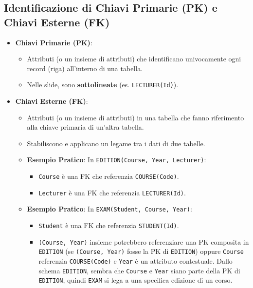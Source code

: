 \subsection{Identificazione di Chiavi Primarie (PK) e Chiavi Esterne (FK)}
\begin{itemize}
    \item \textbf{Chiavi Primarie (PK)}:
    \begin{itemize}
        \item Attributi (o un insieme di attributi) che identificano univocamente ogni record (riga) all'interno di una tabella.
        \item Nelle slide, sono \textbf{sottolineate} (es. \texttt{LECTURER(Id)}).
    \end{itemize}
    \item \textbf{Chiavi Esterne (FK)}:
    \begin{itemize}
        \item Attributi (o un insieme di attributi) in una tabella che fanno riferimento alla chiave primaria di un'altra tabella.
        \item Stabiliscono e applicano un legame tra i dati di due tabelle.
        \item \textbf{Esempio Pratico}: In \texttt{EDITION(Course, Year, Lecturer)}:
        \begin{itemize}
            \item \texttt{Course} è una FK che referenzia \texttt{COURSE(Code)}.
            \item \texttt{Lecturer} è una FK che referenzia \texttt{LECTURER(Id)}.
        \end{itemize}
        \item \textbf{Esempio Pratico}: In \texttt{EXAM(Student, Course, Year)}:
        \begin{itemize}
            \item \texttt{Student} è una FK che referenzia \texttt{STUDENT(Id)}.
            \item \texttt{(Course, Year)} insieme potrebbero referenziare una PK composita in \texttt{EDITION} (se \texttt{(Course, Year)} fosse la PK di \texttt{EDITION}) oppure \texttt{Course} referenzia \texttt{COURSE(Code)} e \texttt{Year} è un attributo contestuale. Dallo schema \texttt{EDITION}, sembra che \texttt{Course} e \texttt{Year} siano parte della PK di \texttt{EDITION}, quindi \texttt{EXAM} si lega a una specifica edizione di un corso.
        \end{itemize}
    \end{itemize}
\end{itemize}

